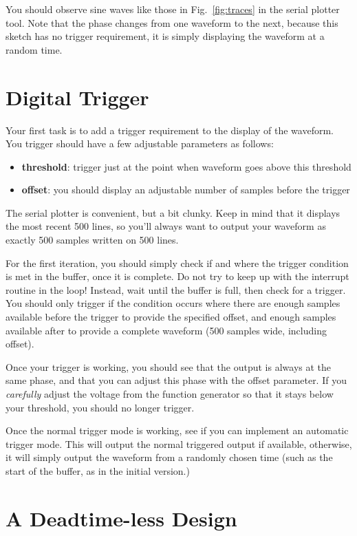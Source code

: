 \documentclass[12pt]{article}
\begin{document}
You should observe sine waves like those in Fig.~\ref{fig:traces} in the serial plotter tool.  Note that the phase changes from one waveform to the next, because this sketch has no trigger requirement, it is simply displaying the waveform at a random time.

\section{Digital Trigger}

Your first task is to add a trigger requirement to the display of the waveform.  You trigger should have a few adjustable parameters as follows:
\begin{itemize}
 \item {\bf threshold}:  trigger just at the point when waveform goes above this threshold
 \item {\bf offset}:  you should display an adjustable number of samples before the trigger
\end{itemize}

The serial plotter is convenient, but a bit clunky.  Keep in mind that it displays the most recent 500 lines, so you'll always want to output your waveform as exactly 500 samples written on 500 lines.

For the first iteration, you should simply check if and where the trigger condition is met in the buffer, once it is complete.  Do not try to keep up with the interrupt routine in the loop!  Instead, wait until the buffer is full, then check for a trigger.  You should only trigger if the condition occurs where there are enough samples available before the trigger to provide the specified offset, and enough samples available after to provide a complete waveform (500 samples wide, including offset).

Once your trigger is working, you should see that the output is always at the same phase, and that you can adjust this phase with the offset parameter.  If you {\em carefully} adjust the voltage from the function generator so that it stays below your threshold, you should no longer trigger.

Once the normal trigger mode is working, see if you can implement an automatic trigger mode.  This will output the normal triggered output if available, otherwise, it will simply output the waveform from a randomly chosen time (such as the start of the buffer, as in the initial version.)

\section{A Deadtime-less Design}
\end{document}
